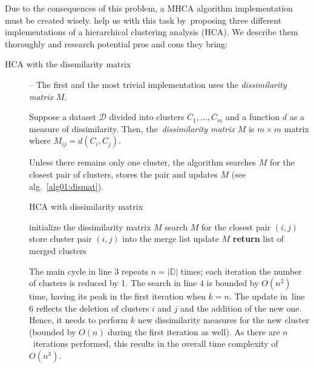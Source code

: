 Due to the consequences of this problem, a MHCA algorithm implementation must be created wisely. \citet{day1984efficient} help us with this task by~proposing three different implementations of a hierarchical clustering analysis (HCA). We describe them thoroughly and research potential pros and cons they bring:

\begin{description}
	\item[HCA with the dissmilarity matrix] -- The first and the most trivial implementation uses the \emph{dissimilarity matrix} $M$.
	
	\begin{defn}
		Suppose a dataset $\mathcal{D}$ divided into clusters $C_1,\dots,C_m$ and a function $d$ as a measure of dissimilarity. Then, the~\emph{dissimilarity matrix} $M$ is $m\times m$ matrix where $M_{ij} = d(C_i,C_j)$.
		\label{def01:dismat}
	\end{defn}

 Unless there remains only one cluster, the algorithm searches $M$ for the closest pair of clusters, stores the pair and updates $M$ (see alg.~\ref{alg01:dismat}).
	
	\begin{algorithm}
		\caption{HCA with dissimilarity matrix}
		\label{alg01:dismat}
		\begin{algorithmic}[1]
			\State initialize the dissimilarity matrix $M$
			\State search $M$ for the closest pair $(i,j)$ 
			\State store cluster pair $(i,j)$ into the merge list 
			\State update $M$ 
			\EndFor
			\State \textbf{return} list of merged clusters
			\EndProcedure
		\end{algorithmic}
	\end{algorithm}

	The main cycle in line $3$ repeats $n = |\mathbb{D}|$ times; each iteration the number of clusters is reduced by 1. The search in line $4$ is bounded by $O(n^2)$ time, having its peak in the first iteration when $k=n$. The update in~line~$6$ reflects the deletion of clusters $i$ and $j$ and the addition of the new one. Hence, it needs to perform $k$ new dissimilarity measures for the new cluster (bounded by $O(n)$ during the first iteration as well). As there are $n$~iterations performed, this results in the overall time complexity of $O(n^3)$. 
	

\end{description}
